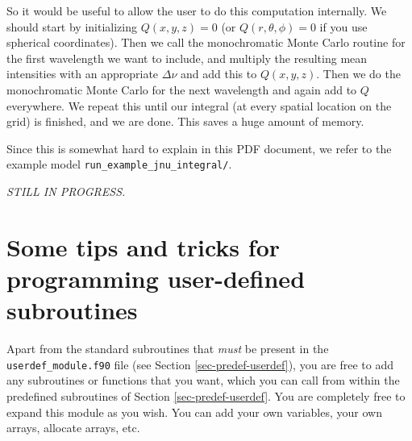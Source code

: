 \documentclass{report}
\begin{document}
So it would be useful to allow the user to do this computation internally.
We should start by initializing $Q(x,y,z)=0$ (or $Q(r,\theta,\phi)=0$ if
you use spherical coordinates). Then we call the monochromatic Monte Carlo
routine for the first wavelength we want to include, and multiply the
resulting mean intensities with an appropriate $\Delta\nu$ and add this
to $Q(x,y,z)$. Then we do the  monochromatic Monte Carlo for the next
wavelength and again add to $Q$ everywhere. We repeat this until our
integral (at every spatial location on the grid) is finished, and we are
done. This saves a huge amount of memory.

Since this is somewhat hard to explain in this PDF document, we refer to
the example model {\small\tt run\_example\_jnu\_integral/}.

{\em STILL IN PROGRESS.}


\section{Some tips and tricks for programming user-defined subroutines}
Apart from the standard subroutines that {\em must} be present in the
{\small\tt userdef\_module.f90} file (see Section \ref{sec-predef-userdef}),
you are free to add any subroutines or functions that you want, which you
can call from within the predefined subroutines of Section
\ref{sec-predef-userdef}. You are completely free to expand this module as
you wish. You can add your own variables, your own arrays, allocate arrays,
etc. 
\end{document}
